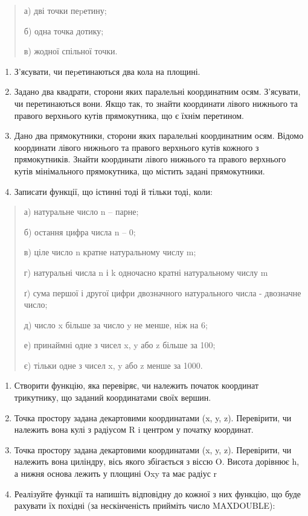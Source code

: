 \documentclass[]{article}
\begin{document}
\begin{quote}
а) дві точки пеpетину;

б) одна точка дотику;

в) жодної спільної точки.
\end{quote}

\begin{enumerate}
\def\labelenumi{\arabic{enumi})}
\setcounter{enumi}{7}
\item
  З'ясувати, чи пеpетинаються два кола на площині.
\item
  Задано два квадрати, сторони яких паралельні координатним осям.
  З'ясувати, чи перетинаються вони. Якщо так, то знайти координати
  лівого нижнього та правого верхнього кутів прямокутника, що є їхнім
  перетином.
\item
  Дано два прямокутники, сторони яких паралельні координатним осям.
  Відомо координати лівого нижнього та правого верхнього кутів кожного з
  прямокутників. Знайти координати лівого нижнього та правого верхнього
  кутів мінімального прямокутника, що містить задані прямокутники.
\item
  Записати функції, що істинні тоді й тільки тоді, коли:
\end{enumerate}

\begin{quote}
а) натуральне число n -- парне;

б) остання цифра числа n -- 0;

в) ціле число n кратне натуральному числу m;

г) натуральні числа n і k одночасно кратні натуральному числу m

ґ) сума першої і другої цифри двозначного натурального числа - двозначне
число;

д) число x більше за число y не менше, ніж на 6;

е) принаймні одне з чисел x, y або z більше за 100;

є) тільки одне з чисел x, y або z менше за 1000.
\end{quote}

\begin{enumerate}
\def\labelenumi{\arabic{enumi})}
\setcounter{enumi}{7}
\item
  Створити функцію, яка перевіряє, чи належить початок координат
  трикутнику, що заданий координатами своїх вершин.
\item
  Точка простору задана декартовими координатами (x, y, z). Перевірити,
  чи належить вона кулі з радіусом R i центром у початку координат.
\item
  Точка простору задана декартовими координатами (x, y, z). Перевірити,
  чи належить вона циліндру, вісь якого збігається з віссю O. Висота
  дорівнює h, а нижня основа лежить у площині Oxy та має радіус r
\item
  Реалізуйте функції та напишіть відповідну до кожної з них функцію, що
  буде рахувати їх похідні (за нескінченість прийміть число MAXDOUBLE):
\end{enumerate}
\end{document}
